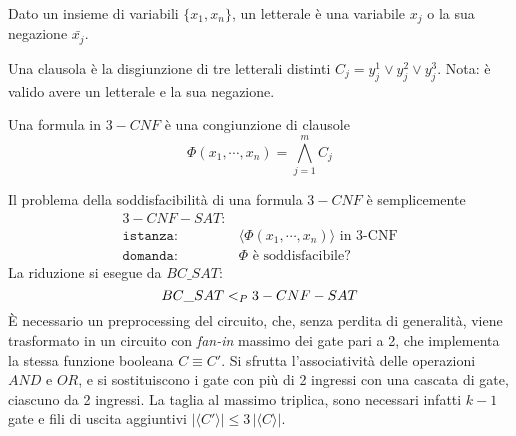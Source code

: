 \begin{definition}[Letterale]
    \label{def:letterale}
    Dato un insieme di variabili $\{ x_1, x_n \}$, un letterale è una variabile $x_j$ o la sua negazione $\bar{x_j}$.
\end{definition}

\begin{definition}[Clausola]
    \label{def:clausola}
    Una clausola è la disgiunzione di tre letterali distinti $C_j =y_j^1 \vee y_j^2 \vee y_j^3$.
    Nota: è valido avere un letterale e la sua negazione.
\end{definition}

\begin{definition}
    Una formula in $3-CNF$ è una congiunzione di clausole
    \begin{equation*}
        \Phi \left( x_1, \cdots, x_n \right) = 
        \bigwedge\limits_{j=1}^{m}
        C_j
    \end{equation*}
    \label{def:formulacnf}
\end{definition}
Il problema della soddisfacibilità di una formula $3-CNF$ è semplicemente
\begin{align*}
    3-CNF-SAT: & \\
    \texttt{istanza:} \quad & \langle \Phi \left( x_1, \cdots, x_n \right) \rangle \text{ in 3-CNF} \\
    \texttt{domanda:} \quad & \Phi \text{ è soddisfacibile?}
\end{align*}
La riduzione si esegue da $BC\_SAT$:
\begin{equation*}
    BC\_SAT <_P 3-CNF-SAT
\end{equation*}
È necessario un preprocessing del circuito, che, senza perdita di generalità, viene trasformato in un circuito con \emph{fan-in} massimo dei gate pari a 2, che implementa la stessa funzione booleana $C \equiv C'$. Si sfrutta l'associatività delle operazioni $AND$ e $OR$, e si sostituiscono i gate con più di 2 ingressi con una cascata di gate, ciascuno da 2 ingressi. La taglia al massimo triplica, sono necessari infatti $k-1$ gate e fili di uscita aggiuntivi $|\langle C' \rangle| \le 3 \, |\langle C \rangle|$.

